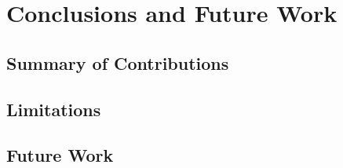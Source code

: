 
\chapter{Conclusions and Future Work}
\label{ch:conclusions}


\FloatBarrier
\section{Summary of Contributions}
\label{sec:contrib}

\FloatBarrier
\section{Limitations}
\label{sec:limit}

\FloatBarrier
\section{Future Work}
\label{sec:fwork}